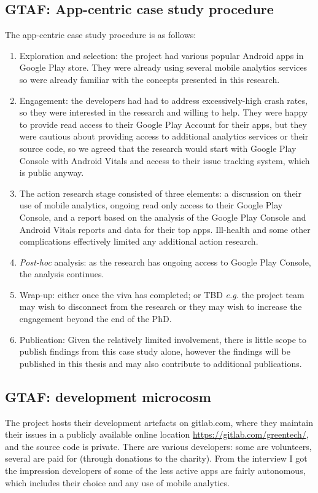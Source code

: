 \subsection{GTAF: App-centric case study procedure}
The app-centric case study procedure is as follows:
{\small
\begin{enumerate}
    \itemsep0em
    \item Exploration and selection: the project had various popular Android apps in Google Play store. They were already using several mobile analytics services so were already familiar with the concepts presented in this research.
    \item Engagement: the developers had had to address excessively-high crash rates, so they were interested in the research and willing to help. They were happy to provide read access to their Google Play Account for their apps, but they were cautious about providing access to additional analytics services or their source code, so we agreed that the research would start with Google Play Console with Android Vitals and access to their issue tracking system, which is public anyway.
    \item The action research stage consisted of three elements: a discussion on their use of mobile analytics, ongoing read only access to their Google Play Console, and a report based on the analysis of the Google Play Console and Android Vitals reports and data for their top apps. Ill-health and some other complications effectively limited any additional action research. 
    \item \textit{Post-hoc} analysis: as the research has ongoing access to Google Play Console, the analysis continues.
    \item Wrap-up: either once the viva has completed; or TBD \textit{e.g.} the project team may wish to disconnect from the research or they may wish to increase the engagement beyond the end of the PhD.
    \item Publication: Given the relatively limited involvement, there is little scope to publish findings from this case study alone, however the findings will be published in this thesis and may also contribute to additional publications.
\end{enumerate}
}


\subsection{GTAF: development microcosm} 
The project hosts their development artefacts on gitlab.com, where they maintain their issues in a publicly available online location \url{https://gitlab.com/greentech/}, and the source code is private. There are various developers: some are volunteers, several are paid for (through donations to the charity). From the interview I got the impression developers of some of the less active apps are fairly autonomous, which includes their choice and any use of mobile analytics. 

